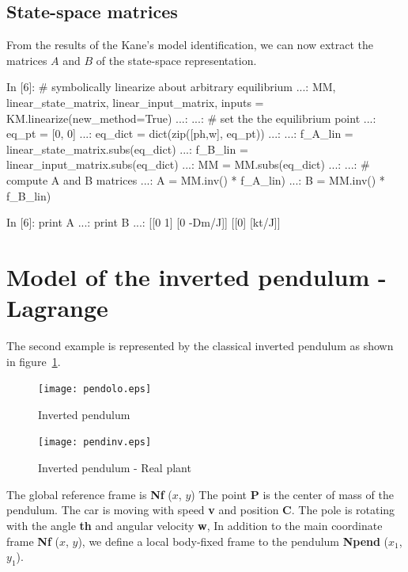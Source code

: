 \subsection{State-space matrices}
From the results of the Kane's model identification, we can now extract the 
matrices $A$ and $B$ of the state-space representation.

\begin{code}
In [6]: # symbolically linearize about arbitrary equilibrium
   ...: MM, linear_state_matrix, linear_input_matrix, inputs = 
KM.linearize(new_method=True)
   ...: 
   ...: # set the the equilibrium point
   ...: eq_pt = [0, 0]
   ...: eq_dict = dict(zip([ph,w], eq_pt))
   ...: 
   ...: f_A_lin = linear_state_matrix.subs(eq_dict)
   ...: f_B_lin = linear_input_matrix.subs(eq_dict)
   ...: MM = MM.subs(eq_dict)
   ...: 
   ...: # compute A and B matrices
   ...: A = MM.inv() * f_A_lin)
   ...: B = MM.inv() * f_B_lin)
\end{code}

\begin{code}
In [6]: print A
   ...: print B
   ...: 
[[0 1]
 [0 -Dm/J]]
[[0]
 [kt/J]]
\end{code}


\section{Model of the inverted pendulum - Lagrange}

The second example is represented by the classical inverted pendulum as shown 
in figure~\ref{F9a}.

\begin{figure}[htbp]	%
\centering
\vspace{8mm}
\texttt{[image: pendolo.eps]}
\caption{Inverted pendulum}
\label{F9a}
\vspace{8mm}
\end{figure}

\begin{figure}[htbp]	%
\centering
\vspace{8mm}
\texttt{[image: pendinv.eps]}
\caption{Inverted pendulum - Real plant}
\label{F9_a}
\vspace{8mm}
\end{figure}

The global reference frame is \textbf{Nf} ($x$, $y$)
The point \textbf{P} is the center of mass of the pendulum. The car is moving 
with speed \textbf{v} and position \textbf{C}.
The pole is rotating with the angle \textbf{th} and angular velocity 
\textbf{w}, 
In addition to the main coordinate frame \textbf{Nf} ($x$, $y$), we define a 
local body-fixed frame to the pendulum \textbf{Npend} ($x_1$, $y_1$).

